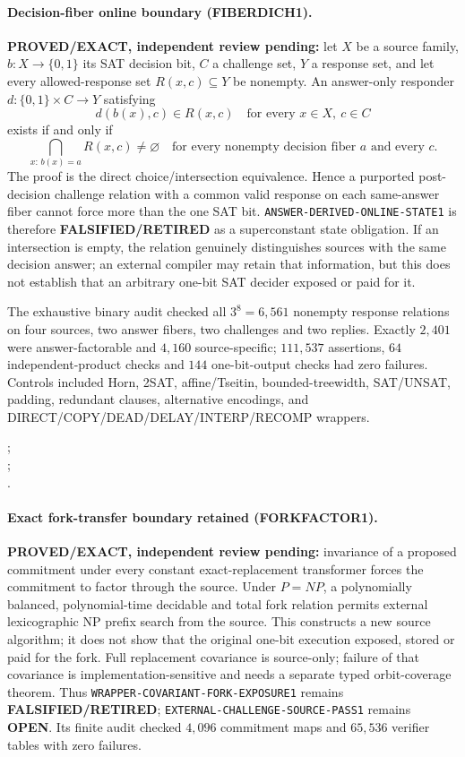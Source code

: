 \documentclass[11pt]{article}
\begin{document}
\paragraph{Decision-fiber online boundary (FIBERDICH1).}
\textbf{PROVED/EXACT, independent review pending:} let \(X\) be a source
family, \(b:X\to\{0,1\}\) its SAT decision bit, \(C\) a challenge set, \(Y\)
a response set, and let every allowed-response set
\(R(x,c)\subseteq Y\) be nonempty.  An answer-only responder
\(d:\{0,1\}\times C\to Y\) satisfying
\[
 d(b(x),c)\in R(x,c)\quad\text{for every }x\in X,\ c\in C
\]
exists if and only if
\[
 \bigcap_{x:\,b(x)=a}R(x,c)\ne\varnothing
 \quad\text{for every nonempty decision fiber }a\text{ and every }c.
\]
The proof is the direct choice/intersection equivalence.  Hence a purported
post-decision challenge relation with a common valid response on each
same-answer fiber cannot force more than the one SAT bit.
\texttt{ANSWER-DERIVED-ONLINE-STATE1} is therefore
\textbf{FALSIFIED/RETIRED} as a superconstant state obligation.  If an
intersection is empty, the relation genuinely distinguishes sources with the
same decision answer; an external compiler may retain that information, but
this does not establish that an arbitrary one-bit SAT decider exposed or paid
for it.

The exhaustive binary audit checked all \(3^8=6{,}561\) nonempty response
relations on four sources, two answer fibers, two challenges and two replies.
Exactly \(2{,}401\) were answer-factorable and \(4{,}160\) source-specific;
\(111{,}537\) assertions, \(64\) independent-product checks and \(144\)
one-bit-output checks had zero failures.  Controls included Horn, 2SAT,
affine/Tseitin, bounded-treewidth, SAT/UNSAT, padding, redundant clauses,
alternative encodings, and DIRECT/COPY/DEAD/DELAY/INTERP/RECOMP wrappers.

;\\
;\\
.

\paragraph{Exact fork-transfer boundary retained (FORKFACTOR1).}
\textbf{PROVED/EXACT, independent review pending:} invariance of a proposed
commitment under every constant exact-replacement transformer forces the
commitment to factor through the source.  Under \(P=NP\), a polynomially
balanced, polynomial-time decidable and total fork relation permits external
lexicographic NP prefix search from the source.  This constructs a new source
algorithm; it does not show that the original one-bit execution exposed,
stored or paid for the fork.  Full replacement covariance is source-only;
failure of that covariance is implementation-sensitive and needs a separate
typed orbit-coverage theorem.  Thus
\texttt{WRAPPER-COVARIANT-FORK-EXPOSURE1} remains
\textbf{FALSIFIED/RETIRED}; \texttt{EXTERNAL-CHALLENGE-SOURCE-PASS1} remains
\textbf{OPEN}.  Its finite audit checked \(4{,}096\) commitment maps and
\(65{,}536\) verifier tables with zero failures.
\end{document}
